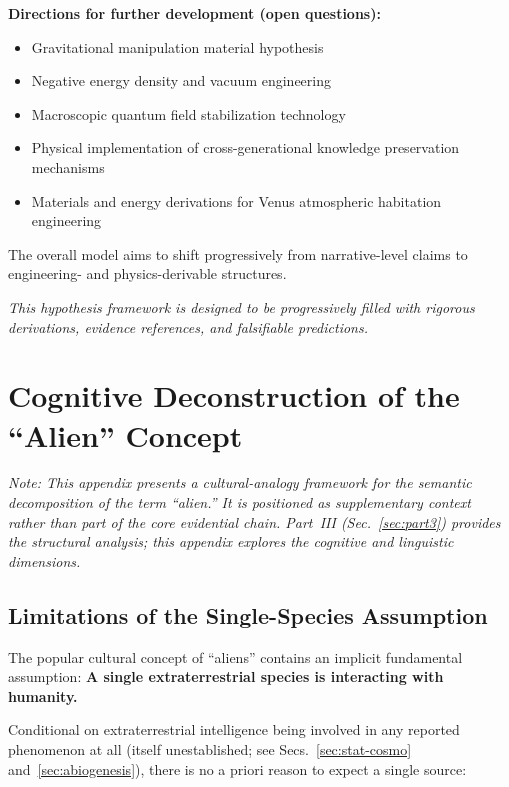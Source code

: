 \documentclass[aps,prd,twocolumn,superscriptaddress,nofootinbib]{revtex4-2}
\begin{document}
\textbf{Directions for further development (open questions):}

\begin{itemize}
  \item Gravitational manipulation material hypothesis
  \item Negative energy density and vacuum engineering
  \item Macroscopic quantum field stabilization technology
  \item Physical implementation of cross-generational knowledge preservation mechanisms
  \item Materials and energy derivations for Venus atmospheric habitation engineering
\end{itemize}

The overall model aims to shift progressively from narrative-level claims to engineering- and physics-derivable structures.

\textit{This hypothesis framework is designed to be progressively filled with rigorous derivations, evidence references, and falsifiable predictions.}


\appendix

\section{Cognitive Deconstruction of the ``Alien'' Concept}\label{sec:appendix-alien}

\textit{Note: This appendix presents a cultural-analogy framework for the semantic decomposition of the term ``alien.'' It is positioned as supplementary context rather than part of the core evidential chain. Part~III (Sec.~\ref{sec:part3}) provides the structural analysis; this appendix explores the cognitive and linguistic dimensions.}

\subsection{Limitations of the Single-Species Assumption}\label{sec:single-species}

The popular cultural concept of ``aliens'' contains an implicit fundamental assumption: \textbf{A single extraterrestrial species is interacting with humanity.}

Conditional on extraterrestrial intelligence being involved in any reported phenomenon at all (itself unestablished; see Secs.~\ref{sec:stat-cosmo} and~\ref{sec:abiogenesis}), there is no a priori reason to expect a single source:
\end{document}
